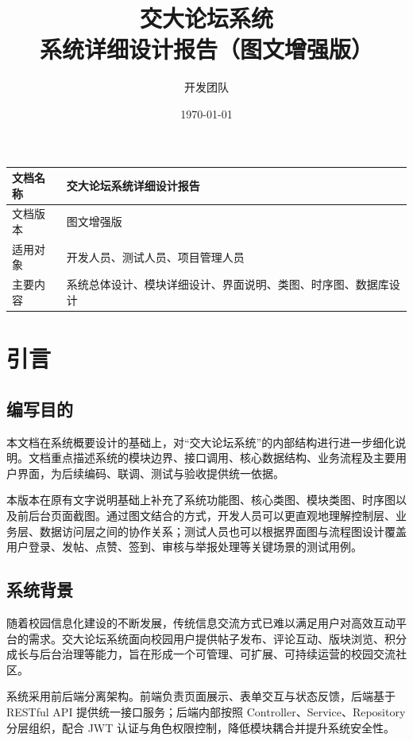 \documentclass[UTF8,a4paper,12pt]{ctexart}
\title{交大论坛系统\\系统详细设计报告（图文增强版）}
\author{开发团队}
\date{\today}
\begin{document}
\maketitle
\thispagestyle{empty}

\begin{center}
\begin{tabular}{|>{\centering\arraybackslash}p{4cm}|>{\centering\arraybackslash}p{8cm}|}
\hline
文档名称 & 交大论坛系统详细设计报告 \\
\hline
文档版本 & 图文增强版 \\
\hline
适用对象 & 开发人员、测试人员、项目管理人员 \\
\hline
主要内容 & 系统总体设计、模块详细设计、界面说明、类图、时序图、数据库设计 \\
\hline
\end{tabular}
\end{center}

\newpage
\tableofcontents
\newpage
\listoffigures
\newpage

\section{引言}

\subsection{编写目的}

本文档在系统概要设计的基础上，对“交大论坛系统”的内部结构进行进一步细化说明。文档重点描述系统的模块边界、接口调用、核心数据结构、业务流程及主要用户界面，为后续编码、联调、测试与验收提供统一依据。

本版本在原有文字说明基础上补充了系统功能图、核心类图、模块类图、时序图以及前后台页面截图。通过图文结合的方式，开发人员可以更直观地理解控制层、业务层、数据访问层之间的协作关系；测试人员也可以根据界面图与流程图设计覆盖用户登录、发帖、点赞、签到、审核与举报处理等关键场景的测试用例。

\subsection{系统背景}

随着校园信息化建设的不断发展，传统信息交流方式已难以满足用户对高效互动平台的需求。交大论坛系统面向校园用户提供帖子发布、评论互动、版块浏览、积分成长与后台治理等能力，旨在形成一个可管理、可扩展、可持续运营的校园交流社区。

系统采用前后端分离架构。前端负责页面展示、表单交互与状态反馈，后端基于 RESTful API 提供统一接口服务；后端内部按照 Controller、Service、Repository 分层组织，配合 JWT 认证与角色权限控制，降低模块耦合并提升系统安全性。
\end{document}
